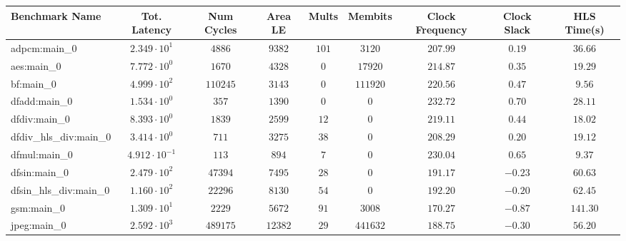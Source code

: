 \begin{tabular}{|l|c|c|c|c|c|c|c|c|}
\hline
Benchmark Name          & Tot. Latency            & Num Cycles & Area LE   & Mults   & Membits    & Clock Frequency & Clock Slack & HLS Time(s) \\
\hline
adpcm:main\_0           & $ 2.349 \cdot 10^{1}  $ & $ 4886   $ & $ 9382  $ & $ 101 $ & $ 3120   $ & $ 207.99      $ & $ 0.19    $ & $ 36.66   $ \\
aes:main\_0             & $ 7.772 \cdot 10^{0}  $ & $ 1670   $ & $ 4328  $ & $ 0   $ & $ 17920  $ & $ 214.87      $ & $ 0.35    $ & $ 19.29   $ \\
bf:main\_0              & $ 4.999 \cdot 10^{2}  $ & $ 110245 $ & $ 3143  $ & $ 0   $ & $ 111920 $ & $ 220.56      $ & $ 0.47    $ & $ 9.56    $ \\
dfadd:main\_0           & $ 1.534 \cdot 10^{0}  $ & $ 357    $ & $ 1390  $ & $ 0   $ & $ 0      $ & $ 232.72      $ & $ 0.70    $ & $ 28.11   $ \\
dfdiv:main\_0           & $ 8.393 \cdot 10^{0}  $ & $ 1839   $ & $ 2599  $ & $ 12  $ & $ 0      $ & $ 219.11      $ & $ 0.44    $ & $ 18.02   $ \\
dfdiv\_hls\_div:main\_0 & $ 3.414 \cdot 10^{0}  $ & $ 711    $ & $ 3275  $ & $ 38  $ & $ 0      $ & $ 208.29      $ & $ 0.20    $ & $ 19.12   $ \\
dfmul:main\_0           & $ 4.912 \cdot 10^{-1} $ & $ 113    $ & $ 894   $ & $ 7   $ & $ 0      $ & $ 230.04      $ & $ 0.65    $ & $ 9.37    $ \\
dfsin:main\_0           & $ 2.479 \cdot 10^{2}  $ & $ 47394  $ & $ 7495  $ & $ 28  $ & $ 0      $ & $ 191.17      $ & $ -0.23   $ & $ 60.63   $ \\
dfsin\_hls\_div:main\_0 & $ 1.160 \cdot 10^{2}  $ & $ 22296  $ & $ 8130  $ & $ 54  $ & $ 0      $ & $ 192.20      $ & $ -0.20   $ & $ 62.45   $ \\
gsm:main\_0             & $ 1.309 \cdot 10^{1}  $ & $ 2229   $ & $ 5672  $ & $ 91  $ & $ 3008   $ & $ 170.27      $ & $ -0.87   $ & $ 141.30  $ \\
jpeg:main\_0            & $ 2.592 \cdot 10^{3}  $ & $ 489175 $ & $ 12382 $ & $ 29  $ & $ 441632 $ & $ 188.75      $ & $ -0.30   $ & $ 56.20   $ \\

\end{tabular}
